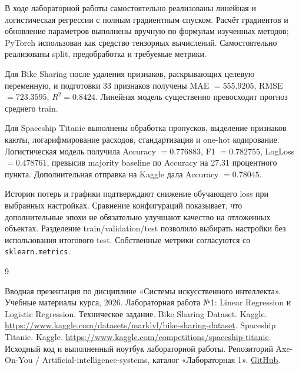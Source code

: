 \documentclass[a4paper,12pt]{article}
\newcommand{\code}[1]{\texttt{#1}}
\begin{document}
В ходе лабораторной работы самостоятельно реализованы линейная
и логистическая регрессии с полным градиентным спуском.
Расчёт градиентов и обновление параметров выполнены вручную
по формулам изученных методов; PyTorch использован как средство
тензорных вычислений. Самостоятельно реализованы split,
предобработка и требуемые метрики.

Для Bike Sharing после удаления признаков, раскрывающих целевую
переменную, и подготовки 33 признаков получены
MAE $=555.9205$, RMSE $=723.3595$, $R^2=0.8424$.
Линейная модель существенно превосходит прогноз среднего train.

Для Spaceship Titanic выполнены обработка пропусков, выделение
признаков каюты, логарифмирование расходов, стандартизация
и one-hot кодирование. Логистическая модель получила
Accuracy $=0.776883$, F1 $=0.782755$, LogLoss $=0.478761$,
превысив majority baseline по Accuracy на 27.31 процентного пункта.
Дополнительная отправка на Kaggle дала Accuracy $=0.78045$.

Истории потерь и графики подтверждают снижение обучающего loss
при выбранных настройках. Сравнение конфигураций показывает,
что дополнительные эпохи не обязательно улучшают качество
на отложенных объектах. Разделение train/validation/test
позволило выбирать настройки без использования итогового test.
Собственные метрики согласуются со \code{sklearn.metrics}.

\clearpage
\begin{thebibliography}{9}
    Вводная презентация по дисциплине «Системы искусственного интеллекта».
    Учебные материалы курса, 2026.
    Лабораторная работа №1: Linear Regression и Logistic Regression.
    Техническое задание.
    Bike Sharing Dataset. Kaggle.
    \url{https://www.kaggle.com/datasets/marklvl/bike-sharing-dataset}.
    Spaceship Titanic. Kaggle.
    \url{https://www.kaggle.com/competitions/spaceship-titanic}.
    Исходный код и выполненный ноутбук лабораторной работы.
    Репозиторий Axe-On-You / Artificial-intelligence-systems,
    каталог «Лабораторная 1».
    \href{https://github.com/Axe-On-You/Artificial-intelligence-systems/tree/main/\%D0\%9B\%D0\%B0\%D0\%B1\%D0\%BE\%D1\%80\%D0\%B0\%D1\%82\%D0\%BE\%D1\%80\%D0\%BD\%D0\%B0\%D1\%8F\%201}{GitHub}.
\end{thebibliography}
\end{document}

